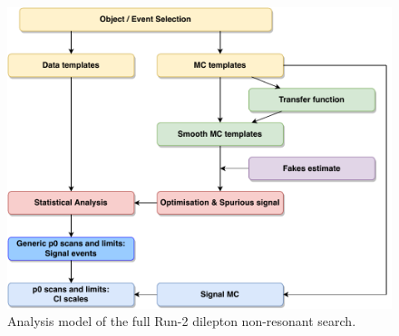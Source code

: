 \begin{figure}[h]
    \centering
    \includegraphics[width=\largefigwidth]{figures/analysis/introduction/AnalysisOverview.pdf}
    \caption[Analysis model of the full Run-2 dilepton non-resonant search]{Analysis model of the full Run-2 dilepton non-resonant search.}
    \label{fig:nonres:intro:analysismodel}
\end{figure}
\clearpage